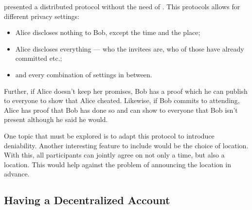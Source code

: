 \citet{EventsInvitations} presented a distributed protocol without the need of 
.
This protocols allows for different privacy settings:
\begin{itemize}
\item Alice discloses nothing to Bob, except the time and the place;
\item Alice discloses everything --- who the invitees are, who of those have 
  already committed etc.;
\item and every combination of settings in between.
\end{itemize}
Further, if Alice doesn't keep her promises, Bob has a proof which he can 
publish to everyone to show that Alice cheated.
Likewise, if Bob commits to attending, Alice has proof that Bob has done so and 
can show to everyone that Bob isn't present although he said he would.

One topic that must be explored is to adapt this protocol to introduce 
deniability.
Another interesting feature to include would be the choice of location.
With this, all participants can jointly agree on not only a time, but also 
a location.
This would help against the problem of announcing the location in advance.



\subsection{Having a Decentralized Account}
\label{passwd}

